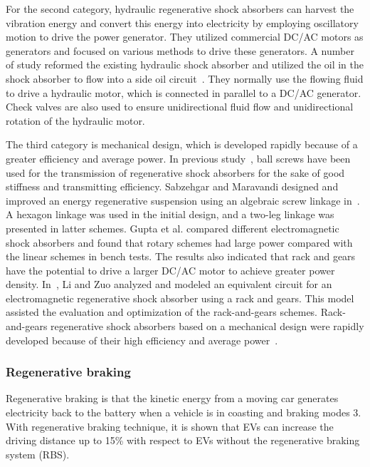 For the second category, hydraulic regenerative shock absorbers can harvest the vibration energy and convert this energy into electricity by employing oscillatory motion to drive the power generator. They utilized commercial DC/AC motors as generators and focused on various methods to drive these generators. A number of study reformed the existing hydraulic shock absorber and utilized the oil in the shock absorber to flow into a side oil circuit~\cite{JX_19,JX_74}. They normally use the flowing fluid to drive a hydraulic motor, which is connected in parallel to a DC/AC generator. Check valves are also used to ensure unidirectional fluid flow and unidirectional rotation of the hydraulic motor.

The third category is mechanical design, which is developed rapidly because of a greater efficiency and average power. In previous study~\cite{JX_3,JX_24,JX_49,JX_59}, ball screws have been used for the transmission of regenerative shock absorbers for the sake of good stiffness and transmitting efficiency. Sabzehgar and Maravandi designed and improved an energy regenerative suspension using an algebraic screw linkage in~\cite{JX_49,JX_59}. A hexagon linkage was used in the initial design, and a two-leg linkage was presented in latter schemes. Gupta et al. \cite{JX_22} compared different electromagnetic shock absorbers and found that rotary schemes had large power compared with the linear schemes in bench tests. The results also indicated that rack and gears have the potential to drive a larger DC/AC motor to achieve greater power density. In~\cite{JX_38}, Li and Zuo analyzed and modeled an equivalent circuit for an electromagnetic regenerative shock absorber using a rack and gears. This model assisted the evaluation and optimization of the rack-and-gears schemes. Rack-and-gears regenerative shock absorbers based on a mechanical design were rapidly developed because of their high efficiency and average power~\cite{JX_39,JX_40}.

\subsubsection{Regenerative braking}

Regenerative braking is that the kinetic energy from a moving car generates electricity back to the battery when a vehicle is in coasting and braking modes 3. With regenerative braking technique, it is shown that EVs can increase the driving distance up to 15\% with respect to EVs without the regenerative braking system (RBS).

